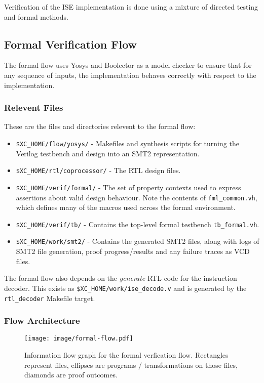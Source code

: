 
Verification of the ISE implementation is done using a mixture of
directed testing and formal methods.

\subsection{Formal Verification Flow}

The formal flow uses Yosys and Boolector as a model checker to ensure that
for any sequence of inputs, the implementation behaves correctly with
respect to the implementation.

\subsubsection{Relevent Files}

These are the files and directories relevent to the formal flow:

\begin{itemize}
\item {\tt \$XC\_HOME/flow/yosys/} - 
    Makefiles and synthesis scripts for turning the Verilog testbench
    and design into an SMT2 representation.
\item {\tt \$XC\_HOME/rtl/coprocessor/} - 
    The RTL design files.
\item {\tt \$XC\_HOME/verif/formal/} - 
    The set of property contexts used to express assertions about valid
    design behaviour. Note the contents of {\tt fml\_common.vh}, which
    defines many of the macros used across the formal environment.
\item {\tt \$XC\_HOME/verif/tb/} - 
    Contains the top-level formal testbench {\tt tb\_formal.vh}.
\item {\tt \$XC\_HOME/work/smt2/} - 
    Contains the generated SMT2 files, along with logs of SMT2 file
    generation, proof progress/results and any failure traces as VCD
    files.
\end{itemize}

The formal flow also depends on the {\em generate} RTL code for the
instruction decoder.
This exists as {\tt \$XC\_HOME/work/ise\_decode.v} and is generated by
the {\tt rtl\_decoder} Makefile target.

\subsubsection{Flow Architecture}

\begin{figure}[h]
\centering
\texttt{[image: image/formal-flow.pdf]}
\caption{Information flow graph for the formal verfication flow. Rectangles
represent files, ellipses are programs / transformations on those files,
diamonds are proof outcomes.}
\label{fig:formal-flow}
\end{figure}

